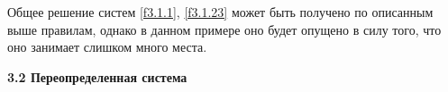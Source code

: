\documentclass[14pt]{extarticle}%
\begin{document}
Общее решение систем \eqref{f3.1.1}, \eqref{f3.1.23} может быть получено по описанным выше правилам, однако в данном примере оно будет опущено в силу того, что оно занимает слишком много места.


\textbf{3.2 Переопределенная система}








\end{document}
